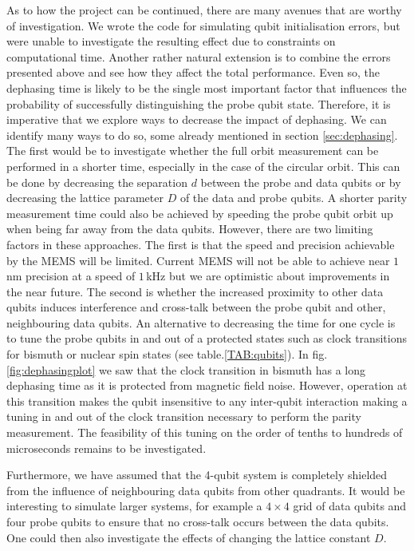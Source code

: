 As to how the project can be continued, there are many avenues that are worthy of investigation. We wrote the code for simulating qubit initialisation errors, but were unable to investigate the resulting effect due to constraints on computational time. Another rather natural extension is to combine the errors presented above and see how they affect the total performance. Even so, the dephasing time is likely to be the single most important factor that influences the probability of successfully distinguishing the probe qubit state. Therefore, it is imperative that we explore ways to decrease the impact of dephasing. We can identify many ways to do so, some already mentioned in section \ref{sec:dephasing}. The first would be to investigate whether the full orbit measurement can be performed in a shorter time, especially in the case of the circular orbit. This can be done by decreasing the separation $d$ between the probe and data qubits or by decreasing the lattice parameter $D$ of the data and probe qubits. A shorter parity measurement time could also be achieved by speeding the probe qubit orbit up when being far away from the data qubits. 
However, there are two limiting factors in these approaches. The first is that the speed and precision achievable by the MEMS will be limited. Current MEMS will not be able to achieve near $1\, $nm precision at a speed of $1\, $kHz \cite{Koo2012,Chu2003} but we are optimistic about improvements in the near future. The second is whether the increased proximity to other data qubits induces interference and cross-talk between the probe qubit and other, neighbouring data qubits. 
An alternative to decreasing the time for one cycle is to tune the probe qubits in and out of a protected states such as clock transitions for bismuth or nuclear spin states (see table.\@ \ref{TAB:qubits}). In fig. \ref{fig:dephasingplot} we saw that the clock transition in bismuth has a long dephasing time as it is protected from magnetic field noise. However, operation at this transition makes the qubit insensitive to any inter-qubit interaction making a tuning in and out of the clock transition necessary to perform the parity measurement. The feasibility of this tuning on the order of tenths to hundreds of microseconds remains to be investigated.


Furthermore, we have assumed that the 4-qubit system is completely shielded from the influence of neighbouring data qubits from other quadrants. It would be interesting to simulate larger systems, for example a $4\times 4$ grid of data qubits and four probe qubits to ensure that no cross-talk occurs between the data qubits. One could then also investigate the effects of changing the lattice constant $D$. 

